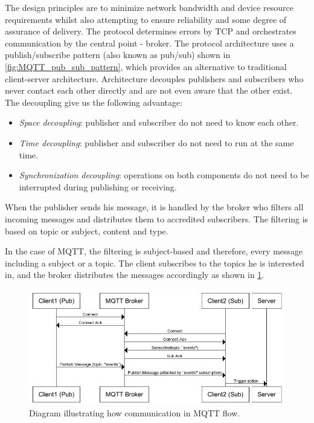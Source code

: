 The design principles are to minimize network bandwidth and device resource requirements whilst also attempting to ensure reliability and some degree of assurance of delivery. The protocol determines errors by TCP and orchestrates communication by the central point - broker. The protocol architecture uses a publish/subscribe pattern (also known as pub/sub) shown in \cref{fig:MQTT_pub_sub_pattern}, which provides an alternative to traditional client-server architecture. Architecture decouples publishers and subscribers who never contact each other directly and are not even aware that the other exist. The decoupling give us the following advantage:

\begin{itemize}
	\item \textit{Space decoupling}: publisher and subscriber do not need to know each other.
	\item \textit{Time decoupling}: publisher and subscriber do not need to run at the same time.
	\item \textit{Synchronization decoupling}: operations on both components do not need to be interrupted during publishing or receiving.
\end{itemize}

When the publisher sends his message, it is handled by the broker who filters all incoming messages and distributes them to accredited subscribers. The filtering is based on topic or subject, content and type.

In the case of MQTT, the filtering is subject-based and therefore, every message including a subject or a topic. The client subscribes to the topics he is interested in, and the broker distributes the messages accordingly as shown in \cref{fig:MQTT_pub_sub_communication_diagram}.

\begin{figure}[H]
	\centering
	\includegraphics[width=\textwidth]{img/MQTT_pub_sub_communication_diagram.png}
	\caption{Diagram illustrating how communication in MQTT flow.}
	\label{fig:MQTT_pub_sub_communication_diagram}
  \end{figure}

